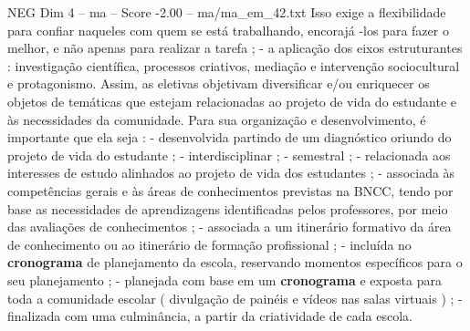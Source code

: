 \begin{textsample}{NEG Dim 4 – ma – Score -2.00 – ma/ma\_em\_42.txt}
Isso exige a flexibilidade para confiar naqueles com quem se está trabalhando, encorajá -los para fazer o melhor, e não apenas para realizar a tarefa ; - a aplicação dos eixos estruturantes : investigação científica, processos criativos, mediação e intervenção sociocultural e protagonismo.
Assim, as eletivas objetivam diversificar e/ou enriquecer os objetos de temáticas que estejam relacionadas ao projeto de vida do estudante e às necessidades da comunidade.
Para sua organização e desenvolvimento, é importante que ela seja : - desenvolvida partindo de um diagnóstico oriundo do projeto de vida do estudante ; - interdisciplinar ; - semestral ; - relacionada aos interesses de estudo alinhados ao projeto de vida dos estudantes ; - associada às competências gerais e às áreas de conhecimentos previstas na BNCC, tendo por base as necessidades de aprendizagens identificadas pelos professores, por meio das avaliações de conhecimentos ; - associada a um itinerário formativo da área de conhecimento ou ao itinerário de formação profissional ; - incluída no \textbf{cronograma} de planejamento da escola, reservando momentos específicos para o seu planejamento ; - planejada com base em um \textbf{cronograma} e exposta para toda a comunidade escolar ( divulgação de painéis e vídeos nas salas virtuais ) ; - finalizada com uma culminância, a partir da criatividade de cada escola.

\end{textsample}
